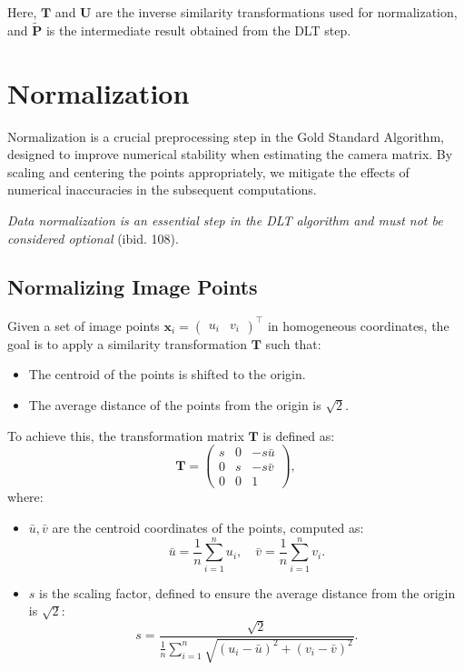 \documentclass[12pt]{article}
\begin{document}
Here, $ \mathbf{T} $ and $ \mathbf{U} $ are the inverse similarity transformations used for normalization, and $ \tilde{\mathbf{P}} $ is the intermediate result obtained from the DLT step.

\section{Normalization}

Normalization is a crucial preprocessing step in the Gold Standard Algorithm, designed to improve numerical stability when estimating the camera matrix. By scaling and centering the points appropriately, we mitigate the effects of numerical inaccuracies in the subsequent computations.

\textit{Data normalization is an essential step in the DLT algorithm and must not be considered optional} (ibid. 108).

\subsection{Normalizing Image Points}
Given a set of image points $ \mathbf{x}_i = \begin{pmatrix} u_i & v_i \end{pmatrix}^\top $ in homogeneous coordinates, the goal is to apply a similarity transformation $ \mathbf{T} $ such that:
\begin{itemize}
    \item The centroid of the points is shifted to the origin.
    \item The average distance of the points from the origin is $\sqrt{2}$.
\end{itemize}

To achieve this, the transformation matrix $ \mathbf{T} $ is defined as:
$$
\mathbf{T} = 
\begin{pmatrix} 
s & 0 & -s \bar{u} \\
0 & s & -s \bar{v} \\
0 & 0 & 1 
\end{pmatrix},
$$
where:
\begin{itemize}
    \item $ \bar{u}, \bar{v} $ are the centroid coordinates of the points, computed as:
    $$
    \bar{u} = \frac{1}{n} \sum_{i=1}^n u_i, \quad \bar{v} = \frac{1}{n} \sum_{i=1}^n v_i.
    $$
    \item $ s $ is the scaling factor, defined to ensure the average distance from the origin is $\sqrt{2}$:
    $$
    s = \frac{\sqrt{2}}{\displaystyle\frac{1}{n} \sum_{i=1}^n \sqrt{(u_i - \bar{u})^2 + (v_i - \bar{v})^2}}.
    $$
\end{itemize}
\end{document}
